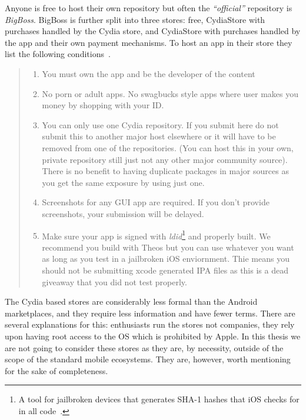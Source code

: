 \documentclass[thesis.tex]{subfiles}
\begin{document}
Anyone is free to host their own repository but often the \emph{``official''} repository is \emph{BigBoss}.
BigBoss is further split into three stores: free, CydiaStore with purchases handled by the Cydia store, and CydiaStore with purchases handled by the app and their own payment mechanisms.  To host an app in their store they list the following conditions~\cite{bigboss_host_2014}.

\begin{quotation}\noindent
  \begin{enumerate}
    \item You must own the app and be the developer of the content

    \item No porn or adult apps. No swagbucks style apps where user makes you money by shopping with your ID.

    \item You can only use one Cydia repository. If you submit here do not submit this to another major host elsewhere or it will have to be removed from one of the repositories. (You can host this in your own, private repository still just not any other major community source). There is no benefit to having duplicate packages in major sources as you get the same exposure by using just one.

    \item Screenshots for any GUI app are required. If you don't provide screenshots, your submission will be delayed.

    \item Make sure your app is signed with \emph{ldid}\footnote{A tool for jailbroken devices that generates SHA-1 hashes that iOS checks for in all code~\cite{saurik_code_nodate}.} and properly built. We recommend you build with Theos but you can use whatever you want as long as you test in a jailbroken iOS enviornment. Thie means you should not be submitting xcode generated IPA files as this is a dead giveaway that you did not test properly.
  \end{enumerate}
\end{quotation}

The Cydia based stores are considerably less formal than the Android
marketplaces, and they require less information and have fewer terms.
There are several explanations for this: enthusiasts run the stores
not companies, they rely upon having root access to the OS which is
prohibited by Apple.  In this thesis we are not going to consider
these stores as they are, by necessity, outside of the scope of the
standard mobile ecosystems.  They are, however, worth mentioning for
the sake of completeness.
\end{document}
